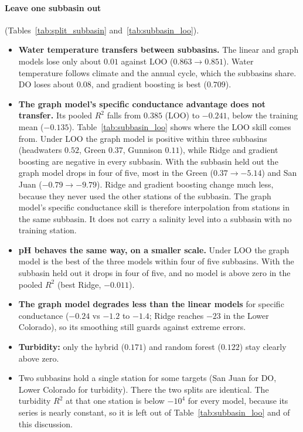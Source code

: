 \documentclass[11pt]{article}
\begin{document}
\paragraph{Leave one subbasin out} (Tables~\ref{tab:split_subbasin} and~\ref{tab:subbasin_loo}).
\begin{itemize}
  \item \textbf{Water temperature transfers between subbasins.} The linear and graph models lose
        only about $0.01$ against LOO ($0.863\to0.851$). Water temperature follows climate and the
        annual cycle, which the subbasins share. DO loses about $0.08$, and gradient boosting is
        best ($0.709$).
  \item \textbf{The graph model's specific conductance advantage does not transfer.} Its pooled
        $R^2$ falls from $0.385$ (LOO) to $-0.241$, below the training mean ($-0.135$).
        Table~\ref{tab:subbasin_loo} shows where the LOO skill comes from. Under LOO the graph model
        is positive within three subbasins (headwaters $0.52$, Green $0.37$, Gunnison $0.11$),
        while Ridge and gradient boosting are negative in every subbasin. With the subbasin held out
        the graph model drops in four of five, most in the Green ($0.37\to-5.14$) and San Juan
        ($-0.79\to-9.79$). Ridge and gradient boosting change much less, because they never used
        the other stations of the subbasin. The graph model's specific conductance skill is
        therefore interpolation from stations in the same subbasin. It does not carry a salinity
        level into a subbasin with no training station.
  \item \textbf{pH behaves the same way, on a smaller scale.} Under LOO the graph model is the best
        of the three models within four of five subbasins. With the subbasin held out it drops in
        four of five, and no model is above zero in the pooled $R^2$ (best Ridge, $-0.011$).
  \item \textbf{The graph model degrades less than the linear models} for specific conductance
        ($-0.24$ vs $-1.2$ to $-1.4$; Ridge reaches $-23$ in the Lower Colorado), so its
        smoothing still guards against extreme errors.
  \item \textbf{Turbidity:} only the hybrid ($0.171$) and random forest ($0.122$) stay clearly
        above zero.
  \item Two subbasins hold a single station for some targets (San Juan for DO, Lower Colorado for
        turbidity). There the two splits are identical. The turbidity $R^2$ at that one station is
        below $-10^4$ for every model, because its series is nearly constant, so it is left out of
        Table~\ref{tab:subbasin_loo} and of this discussion.
\end{itemize}
\end{document}
